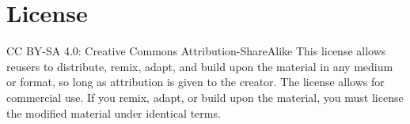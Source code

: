 \setcounter{subsection}{0}
\section*{License}
CC BY-SA 4.0: Creative Commons Attribution-ShareAlike
This license allows reusers to distribute, remix, adapt, and build upon the material in any medium or format, so long as attribution is given to the creator. The license allows for commercial use. If you remix, adapt, or build upon the material, you must license the modified material under identical terms.

